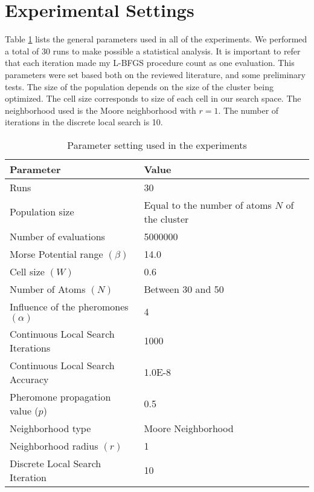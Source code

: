 \section{Experimental Settings}
\label{sec:experimental_setting}

Table \ref{tab:general_settings} lists the general parameters used in all of the experiments. We performed a total of 30 runs to make possible a statistical analysis. It is important to refer that each iteration made my L-BFGS procedure count as one evaluation. This parameters were set based both on the reviewed literature, and some preliminary tests. The size of the population depends on the size of the cluster being optimized. 
The cell size corresponds to size of each cell in our search space. The neighborhood used is the Moore neighborhood with $r = 1$. The number of iterations in the discrete local search is 10.

\begin{table}[!htbp]
	\begin{center}
		\begin{tabular}{| l | p{8cm} |}
			\hline
			\textbf{Parameter} & \textbf{Value} \\ \hline
			Runs & 30 \\
			Population size & Equal to the number of atoms $N$ of the cluster \\
			Number of evaluations & 5000000 \\
			Morse Potential range $(\beta)$ & 14.0 \\ 
			Cell size $(W)$ & 0.6 \\
			Number of Atoms $(N)$ & Between 30 and 50 \\
			Influence of the pheromones $(\alpha)$ & 4 \\
			Continuous Local Search Iterations & 1000\\
			Continuous Local Search Accuracy & 1.0E-8\\
			Pheromone propagation value ($p$) & 0.5 \\
			Neighborhood type & Moore Neighborhood \\
			Neighborhood radius $(r)$ & 1 \\
			Discrete Local Search Iteration & 10 \\
			\hline
		\end{tabular}
	\caption{Parameter setting used in the experiments}
	\label{tab:general_settings}
	\end{center}
\end{table}


